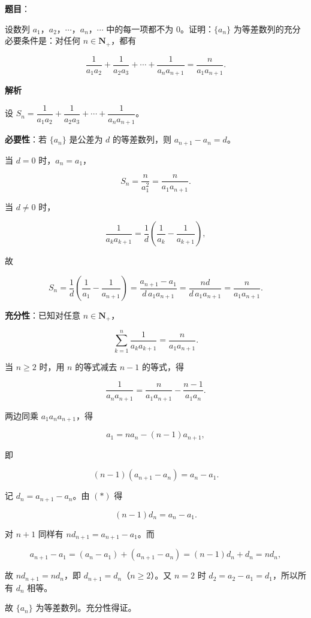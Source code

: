 \begin{answer}

\textbf{题目}：

设数列 $a_1$，$a_2$，$\cdots$，$a_n$，$\cdots$ 中的每一项都不为 $0$。证明：$\{a_n\}$ 为等差数列的充分必要条件是：对任何 $n\in\mathbf N_+$，都有

\nopagebreak[4]
\[\frac1{a_1a_2}+\frac1{a_2a_3}+\cdots+\frac1{a_na_{n+1}}=\frac{n}{a_1a_{n+1}}.\]

\textbf{解析}

设 $S_n=\dfrac1{a_1a_2}+\dfrac1{a_2a_3}+\cdots+\dfrac1{a_na_{n+1}}$。

\textbf{必要性}：若 $\{a_n\}$ 是公差为 $d$ 的等差数列，则 $a_{n+1}-a_n=d$。

当 $d=0$ 时，$a_n=a_1$，

\nopagebreak[4]
\[S_n=\frac{n}{a_1^2}=\frac{n}{a_1a_{n+1}}.\]

当 $d\neq0$ 时，

\nopagebreak[4]
\[\frac1{a_ka_{k+1}}=\frac1d\left(\frac1{a_k}-\frac1{a_{k+1}}\right),\]

故

\nopagebreak[4]
\[S_n=\frac1d\left(\frac1{a_1}-\frac1{a_{n+1}}\right)
=\frac{a_{n+1}-a_1}{d\,a_1a_{n+1}}
=\frac{nd}{d\,a_1a_{n+1}}
=\frac{n}{a_1a_{n+1}}.\]

\textbf{充分性}：已知对任意 $n\in\mathbf N_+$，

\nopagebreak[4]
\[\sum_{k=1}^n\frac1{a_ka_{k+1}}=\frac{n}{a_1a_{n+1}}.\]

当 $n\geqslant2$ 时，用 $n$ 的等式减去 $n-1$ 的等式，得

\nopagebreak[4]
\[\frac1{a_na_{n+1}}
=\frac{n}{a_1a_{n+1}}-\frac{n-1}{a_1a_n}.\]

两边同乘 $a_1a_na_{n+1}$，得

\nopagebreak[4]
\[a_1=na_n-(n-1)a_{n+1},\]

即

\nopagebreak[4]
\[(n-1)(a_{n+1}-a_n)=a_n-a_1.\tag{$*$}\]

记 $d_n=a_{n+1}-a_n$。由 $(*)$ 得

\nopagebreak[4]
\[(n-1)d_n=a_n-a_1.\]

对 $n+1$ 同样有 $n d_{n+1}=a_{n+1}-a_1$。而

\nopagebreak[4]
\[a_{n+1}-a_1=(a_n-a_1)+(a_{n+1}-a_n)=(n-1)d_n+d_n=nd_n,\]

故 $n d_{n+1}=n d_n$，即 $d_{n+1}=d_n$（$n\geqslant2$）。又 $n=2$ 时 $d_2=a_2-a_1=d_1$，所以所有 $d_n$ 相等。

故 $\{a_n\}$ 为等差数列。充分性得证。


\end{answer}
